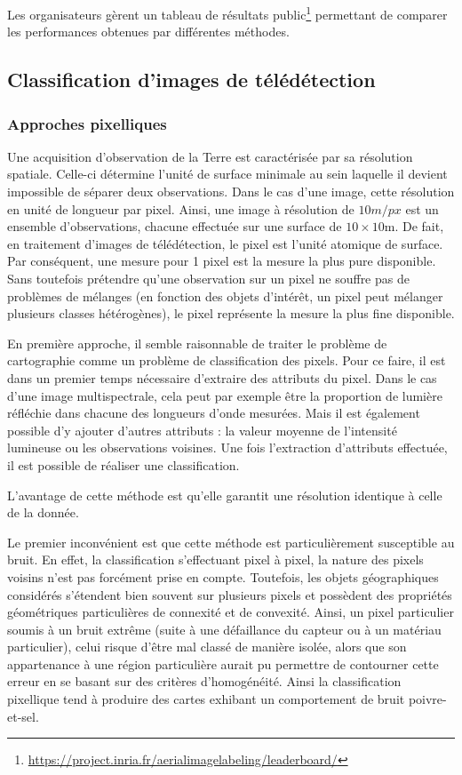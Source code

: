 Les organisateurs gèrent un tableau de résultats public\footnote{\url{https://project.inria.fr/aerialimagelabeling/leaderboard/}} permettant de comparer les performances obtenues par différentes méthodes.

\subsection{Classification d'images de télédétection}

\subsubsection{Approches pixelliques}

Une acquisition d'observation de la Terre est caractérisée par sa résolution spatiale. Celle-ci détermine l'unité de surface minimale au sein laquelle il devient impossible de séparer deux observations. Dans le cas d'une image, cette résolution en unité de longueur par pixel. Ainsi, une image à résolution de $10m/px$ est un ensemble d'observations, chacune effectuée sur une surface de $10\times10$m. De fait, en traitement d'images de télédétection, le pixel est l'unité atomique de surface. Par conséquent, une mesure pour 1 pixel est la mesure la plus pure disponible. Sans toutefois prétendre qu'une observation sur un pixel ne souffre pas de problèmes de mélanges (en fonction des objets d'intérêt, un pixel peut mélanger plusieurs classes hétérogènes), le pixel représente la mesure la plus fine disponible.

En première approche, il semble raisonnable de traiter le problème de cartographie comme un problème de classification des pixels. Pour ce faire, il est dans un premier temps nécessaire d'extraire des attributs du pixel. Dans le cas d'une image multispectrale, cela peut par exemple être la proportion de lumière réfléchie dans chacune des longueurs d'onde mesurées. Mais il est également possible d'y ajouter d'autres attributs : la valeur moyenne de l'intensité lumineuse ou les observations voisines. Une fois l'extraction d'attributs effectuée, il est possible de réaliser une classification.

L'avantage de cette méthode est qu'elle garantit une résolution identique à celle de la donnée.

Le premier inconvénient est que cette méthode est particulièrement susceptible au bruit. En effet, la classification s'effectuant pixel à pixel, la nature des pixels voisins n'est pas forcément prise en compte. Toutefois, les objets géographiques considérés s'étendent bien souvent sur plusieurs pixels et possèdent des propriétés géométriques particulières de connexité et de convexité. Ainsi, un pixel particulier soumis à un bruit extrême (suite à une défaillance du capteur ou à un matériau particulier), celui risque d'être mal classé de manière isolée, alors que son appartenance à une région particulière aurait pu permettre de contourner cette erreur en se basant sur des critères d'homogénéité. Ainsi la classification pixellique tend à produire des cartes exhibant un comportement de bruit poivre-et-sel.

